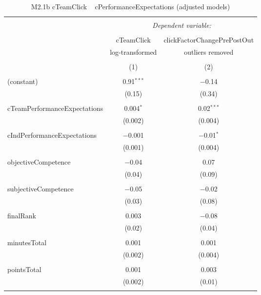 
\begin{table}[!htbp] \centering 
  \caption{M2.1b cTeamClick ~ cPerformanceExpectations (adjusted models)} 
  \label{tab:MLM21bOutLogComparison} 
\begin{tabular}{@{\extracolsep{5pt}}lcc} 
\\[-1.8ex]\hline 
\hline \\[-1.8ex] 
 & \multicolumn{2}{c}{\textit{Dependent variable:}} \\ 
\cline{2-3} 
\\[-1.8ex] & cTeamClick & clickFactorChangePrePostOut \\ 
 & log-transformed & outliers removed \\ 
\\[-1.8ex] & (1) & (2)\\ 
\hline \\[-1.8ex] 
 (constant) & 0.91$^{***}$ & $-$0.14 \\ 
  & (0.15) & (0.34) \\ 
  & & \\ 
 cTeamPerformanceExpectations & 0.004$^{*}$ & 0.02$^{***}$ \\ 
  & (0.002) & (0.004) \\ 
  & & \\ 
 cIndPerformanceExpectations & $-$0.001 & $-$0.01$^{*}$ \\ 
  & (0.001) & (0.004) \\ 
  & & \\ 
 objectiveCompetence & $-$0.04 & 0.07 \\ 
  & (0.04) & (0.09) \\ 
  & & \\ 
 subjectiveCompetence & $-$0.05 & $-$0.02 \\ 
  & (0.03) & (0.08) \\ 
  & & \\ 
 finalRank & 0.003 & $-$0.08 \\ 
  & (0.02) & (0.04) \\ 
  & & \\ 
 minutesTotal & 0.001 & 0.001 \\ 
  & (0.002) & (0.004) \\ 
  & & \\ 
 pointsTotal & 0.001 & 0.003 \\ 
  & (0.002) & (0.01) \\ 
  & & \\ 

\end{tabular}
\end{table}
